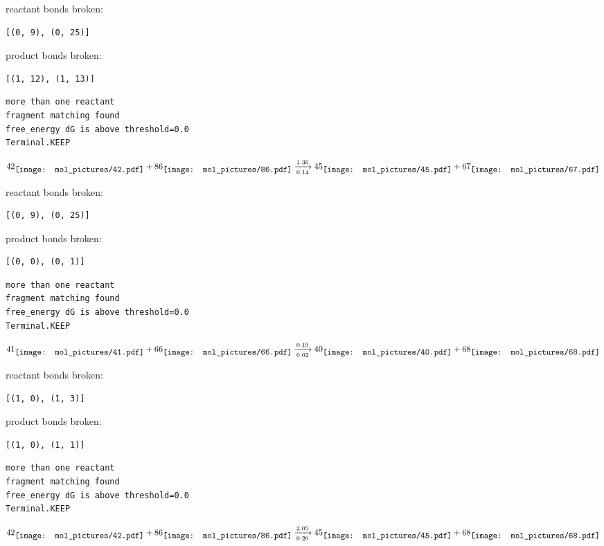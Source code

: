 \documentclass{article}
\begin{document}
reactant bonds broken:\begin{verbatim}
[(0, 9), (0, 25)]
\end{verbatim}
product bonds broken:\begin{verbatim}
[(1, 12), (1, 13)]
\end{verbatim}




\vspace{1cm}
\begin{verbatim}
more than one reactant
fragment matching found
free_energy dG is above threshold=0.0
Terminal.KEEP
\end{verbatim}
$$
42
\raisebox{-.5\height}{\texttt{[image: mol\_pictures/42.pdf]}}
+
86
\raisebox{-.5\height}{\texttt{[image: mol\_pictures/86.pdf]}}
\xrightarrow[0.14]{1.36}
45
\raisebox{-.5\height}{\texttt{[image: mol\_pictures/45.pdf]}}
+
67
\raisebox{-.5\height}{\texttt{[image: mol\_pictures/67.pdf]}}
$$


reactant bonds broken:\begin{verbatim}
[(0, 9), (0, 25)]
\end{verbatim}
product bonds broken:\begin{verbatim}
[(0, 0), (0, 1)]
\end{verbatim}




\vspace{1cm}
\begin{verbatim}
more than one reactant
fragment matching found
free_energy dG is above threshold=0.0
Terminal.KEEP
\end{verbatim}
$$
41
\raisebox{-.5\height}{\texttt{[image: mol\_pictures/41.pdf]}}
+
66
\raisebox{-.5\height}{\texttt{[image: mol\_pictures/66.pdf]}}
\xrightarrow[0.02]{0.19}
40
\raisebox{-.5\height}{\texttt{[image: mol\_pictures/40.pdf]}}
+
68
\raisebox{-.5\height}{\texttt{[image: mol\_pictures/68.pdf]}}
$$


reactant bonds broken:\begin{verbatim}
[(1, 0), (1, 3)]
\end{verbatim}
product bonds broken:\begin{verbatim}
[(1, 0), (1, 1)]
\end{verbatim}




\vspace{1cm}
\begin{verbatim}
more than one reactant
fragment matching found
free_energy dG is above threshold=0.0
Terminal.KEEP
\end{verbatim}
$$
42
\raisebox{-.5\height}{\texttt{[image: mol\_pictures/42.pdf]}}
+
86
\raisebox{-.5\height}{\texttt{[image: mol\_pictures/86.pdf]}}
\xrightarrow[0.20]{2.05}
45
\raisebox{-.5\height}{\texttt{[image: mol\_pictures/45.pdf]}}
+
68
\raisebox{-.5\height}{\texttt{[image: mol\_pictures/68.pdf]}}
$$
\end{document}

